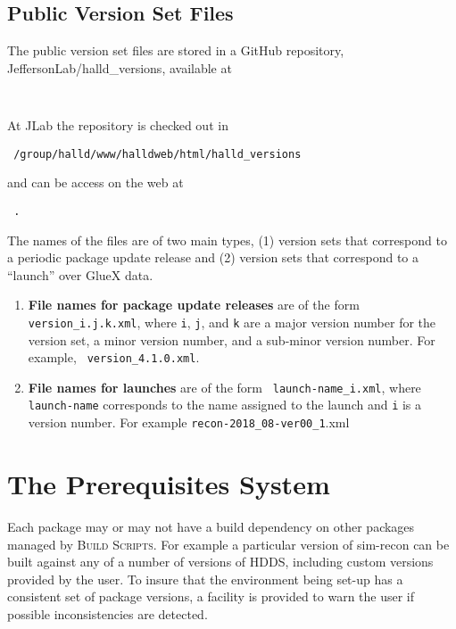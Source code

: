 \documentclass[12pt]{article}
\newcommand{\bs}{\textsc{Build Scripts}}
\begin{document}
\subsection{Public Version Set Files}

The public version set files are stored in a GitHub repository,
JeffersonLab/halld\_versions, available at

\begin{center} \tt
{}
\end{center}
At JLab the repository is checked out in
\begin{center} \tt
/group/halld/www/halldweb/html/halld\_versions
\end{center}
and can be access on the web at
\begin{center} \tt
{}.
\end{center}

The names of the files are of two main types, (1) version sets that
correspond to a periodic package update release and (2) version sets
that correspond to a ``launch'' over GlueX data.
\begin{enumerate}
\item {\bf File names for package update releases} are of the form
  {\tt version\_i.j.k.xml}, where {\tt i}, {\tt j}, and {\tt k} are a
  major version number for the version set, a minor version number,
  and a sub-minor version number. For example, {\tt
    version\_4.1.0.xml}.
\item {\bf File names for launches} are of the form {\tt
  launch-name\_i.xml}, where {\tt launch-name} corresponds to the name
  assigned to the launch and {\tt i} is a version number. For example
  {\tt recon-2018\_08-ver00\_1}.xml
\end{enumerate}

\section{The Prerequisites System}\label{section:prerequisites-system}

Each package may or may not have a build dependency on other packages
managed by \bs{}. For example a particular version of sim-recon can be
built against any of a number of versions of HDDS, including custom
versions provided by the user. To insure that the environment being
set-up has a consistent set of package versions, a facility is
provided to warn the user if possible inconsistencies are detected.
\end{document}
